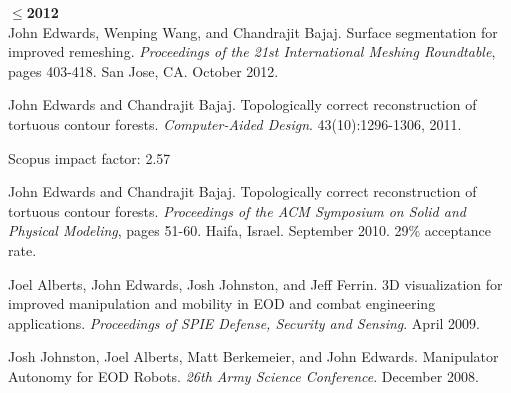 \documentclass[margin,line]{res}
\newcommand{\pubunder}[1]{#1}
\begin{document}
\begin{resume}
\textbf{$\le$2012} \\
\pubunder{John Edwards}, Wenping Wang, and Chandrajit Bajaj. Surface segmentation for improved remeshing. \textit{Proceedings of the 21st International Meshing Roundtable}, pages 403-418. San Jose, CA. October 2012.

\protect \pubunder{John Edwards} and Chandrajit Bajaj. Topologically correct reconstruction of tortuous contour forests. \textit{Computer-Aided Design}. 43(10):1296-1306, 2011.
\begin{IMPACT}
Scopus impact factor: 2.57 %
\end{IMPACT}

\pubunder{John Edwards} and Chandrajit Bajaj. Topologically correct reconstruction of tortuous contour forests. \textit{Proceedings of the ACM Symposium on Solid and Physical Modeling}, pages 51-60. Haifa, Israel. September 2010. 29\% acceptance rate.

Joel Alberts, \pubunder{John Edwards}, Josh Johnston, and Jeff Ferrin. 3D visualization for improved manipulation and mobility in EOD and combat engineering applications. \textit{Proceedings of SPIE Defense, Security and Sensing}. April 2009.

Josh Johnston, Joel Alberts, Matt Berkemeier, and \pubunder{John Edwards}. Manipulator Autonomy for EOD Robots. \textit{26th Army Science Conference}. December 2008.

\begin{IMPACT}
\end{IMPACT}






\end{resume}
\end{document}
